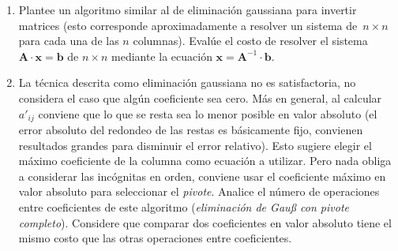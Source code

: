   \begin{enumerate}
  \item
    Plantee un algoritmo similar al de eliminación gaussiana
    para invertir matrices
    (esto corresponde aproximadamente a resolver un sistema de~\(n \times n\)
     para cada una de las \(n\) columnas).
    Evalúe el costo de resolver
    el sistema \(\mathbf{A} \cdot \mathbf{x} = \mathbf{b}\) de \(n \times n\)
    mediante la ecuación \(\mathbf{x} = \mathbf{A}^{-1} \cdot \mathbf{b}\).
  \item
    La técnica descrita como eliminación gaussiana no es satisfactoria,
    no considera el caso que algún coeficiente sea cero.
    Más en general,
    al calcular \(a'_{i j}\) conviene que lo que se resta sea lo menor posible
    en valor absoluto
    (el error absoluto del redondeo de las restas es básicamente fijo,
     convienen resultados grandes para disminuir el error relativo).
    Esto sugiere elegir el máximo coeficiente de la columna
    como ecuación a utilizar.
    Pero nada obliga a considerar las incógnitas en orden,
    conviene usar el coeficiente máximo en valor absoluto
    para seleccionar el \emph{pivote}.
    Analice el número de operaciones entre coeficientes
    de este algoritmo
    (\emph{eliminación de Gauß con pivote completo}).
    Considere que comparar dos coeficientes en valor absoluto
    tiene el mismo costo que las otras operaciones entre coeficientes.
  \end{enumerate}




